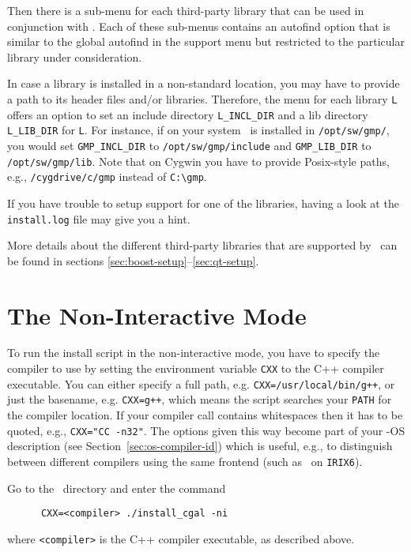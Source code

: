 Then there is a sub-menu for each third-party library that can be used
in conjunction with \cgal. Each of these sub-menus contains an
autofind option that is similar to the global autofind in the support
menu but restricted to the particular library under consideration.

In case a library is installed in a non-standard location, you may
have to provide a path to its header files and/or libraries.
Therefore, the menu for each library \texttt{L} offers an option to
set an include directory \texttt{L\_INCL\_DIR} and a lib directory
\texttt{L\_LIB\_DIR} for \texttt{L}. For instance, if on your system
\gmp\ is installed in \texttt{/opt/sw/gmp/}, you would set
\texttt{GMP\_INCL\_DIR} to \texttt{/opt/sw/gmp/include} and
\texttt{GMP\_LIB\_DIR} to \texttt{/opt/sw/gmp/lib}. Note that on
Cygwin you have to provide Posix-style paths, e.g.,
\texttt{/cygdrive/c/gmp} instead of \verb|C:\gmp|.

If you have trouble to setup support for one of the libraries, having
a look at the \texttt{install.log} file may give you a hint.

More details about the different third-party libraries that are
supported by \cgal\ can be found in sections
\ref{sec:boost-setup}--\ref{sec:qt-setup}.

\section{The Non-Interactive Mode\label{sec:non-interactive}}

To run the install script in the non-interactive mode, you have to
specify the compiler to use by setting the environment variable
\texttt{CXX} to the C++ compiler executable.
You can either specify a full path, e.g.
\texttt{CXX=/usr/local/bin/g++}, or just the basename, e.g.
\texttt{CXX=g++}, which means the script searches your \texttt{PATH}
for the compiler location. If your compiler call contains whitespaces
then it has to be quoted, e.g., \texttt{CXX="CC -n32"}. The options
given this way become part of your \cgal-OS description (see Section~\ref{sec:os-compiler-id}) which is useful,
e.g., to distinguish between different compilers using the same
frontend (such as \mipsprocc\ on \texttt{IRIX6}).

Go to the \cgaldir\ directory and enter the command
\begin{verbatim}
      CXX=<compiler> ./install_cgal -ni
\end{verbatim}
where \texttt{<compiler>} is the C++ compiler executable, as described
above.

